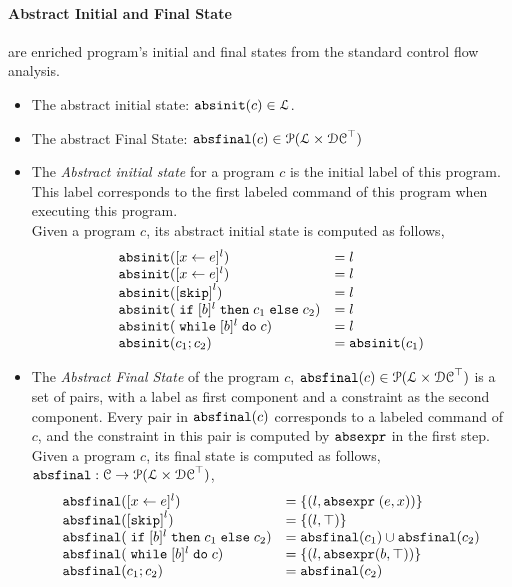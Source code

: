 \paragraph{Abstract Initial and Final State} are enriched program's initial and final states from the standard control flow analysis.

%
\begin{itemize}
\item The abstract initial state: $\mathtt{abs}{\mathtt{init}}(c) \in \mathcal{L}$.
%
\item The abstract Final State: $\mathtt{abs}{\mathtt{final}}(c) \in \mathcal{P}(\mathcal{L} \times \mathcal{DC}^{\top})$
\end{itemize}

\begin{itemize}
  \item The \emph{Abstract initial state} for a program $c$ is the initial label of this program.
This label corresponds to the first labeled command of this program 
when executing this program.
\\
Given a program $c$, its abstract initial state is computed as follows,
%
\[
  \begin{array}{ll}
    \absinit(\clabel{\assign{x}{\expr}}{}^l)  & = l  \\
    \absinit(\clabel{\assign{x}{\expr}}{}^l)  & = l \\
    \absinit(\clabel{\eskip}^{l})  & = l \\
    \absinit(\eif [b]^l \ethen c_1 \eelse c_2)  & = l \\
    \absinit(\ewhile [b]^l \edo c)  & = l \\
    \absinit(c_1 ; c_2)  & = \absinit(c_1) \\
 \end{array}
 \]
%
%
\item The \emph{Abstract Final State} of the program $c$, 
$\mathtt{abs}{\mathtt{final}}(c) \in \mathcal{P}(\mathcal{L} \times \mathcal{DC}^{\top})$
is a set of pairs, with a label as first component and a constraint as the second component.
Every pair in $\mathtt{abs}{\mathtt{final}}(c)$ corresponds to a labeled command of $c$,
and the constraint in this pair is computed by $\mathtt{abs}{\mathtt{expr}}$ in the first step.
\\
Given a program $c$, its final state is computed as follows,
$\mathtt{abs}{\mathtt{final}}: \mathcal{C} \to \mathcal{P}(\mathcal{L} \times \mathcal{DC}^{\top})$,
 \[
  \begin{array}{ll}
    \absfinal(\clabel{\assign{x}{\expr}}{}^l)  & = \{(l, \absexpr\eapp (\expr, x))\}  \\
     \absfinal(\clabel{\eskip}^{l})  
     & = \{(l, \top)\} \\
     \absfinal(\eif [b]^l \ethen c_1 \eelse c_2)  & = \absfinal(c_1) \cup \absfinal(c_2) \\
     \absfinal(\ewhile [b]^l \edo c)  & = \{(l, \absexpr(\bexpr, \top))\} \\
     \absfinal(c_1 ; c_2)  & =  \absfinal(c_2) \\
 \end{array}
 \]
\end{itemize}
